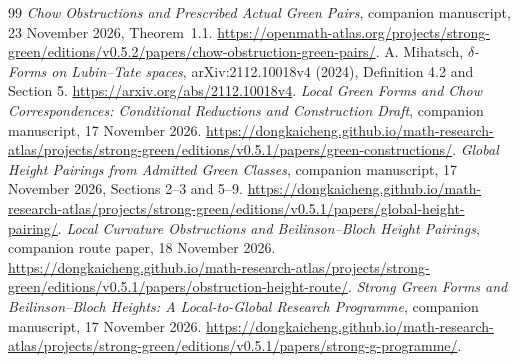 \documentclass[11pt,a4paper]{article}
\theoremstyle{definition}
\numberwithin{equation}{section}
\begin{document}
\begin{thebibliography}{99}
 \emph{Chow Obstructions and Prescribed Actual Green Pairs}, companion manuscript, 23 November 2026, Theorem~1.1. \url{https://openmath-atlas.org/projects/strong-green/editions/v0.5.2/papers/chow-obstruction-green-pairs/}.
 A. Mihatsch, \emph{$\delta$-Forms on Lubin--Tate spaces}, arXiv:2112.10018v4 (2024), Definition 4.2 and Section 5. \url{https://arxiv.org/abs/2112.10018v4}.
 \emph{Local Green Forms and Chow Correspondences: Conditional Reductions and Construction Draft}, companion manuscript, 17 November 2026. \url{https://dongkaicheng.github.io/math-research-atlas/projects/strong-green/editions/v0.5.1/papers/green-constructions/}.
 \emph{Global Height Pairings from Admitted Green Classes}, companion manuscript, 17 November 2026, Sections 2--3 and 5--9. \url{https://dongkaicheng.github.io/math-research-atlas/projects/strong-green/editions/v0.5.1/papers/global-height-pairing/}.
 \emph{Local Curvature Obstructions and Beilinson--Bloch Height Pairings}, companion route paper, 18 November 2026. \url{https://dongkaicheng.github.io/math-research-atlas/projects/strong-green/editions/v0.5.1/papers/obstruction-height-route/}.
 \emph{Strong Green Forms and Beilinson--Bloch Heights: A Local-to-Global Research Programme}, companion manuscript, 17 November 2026. \url{https://dongkaicheng.github.io/math-research-atlas/projects/strong-green/editions/v0.5.1/papers/strong-g-programme/}.
\end{thebibliography}
\end{document}
